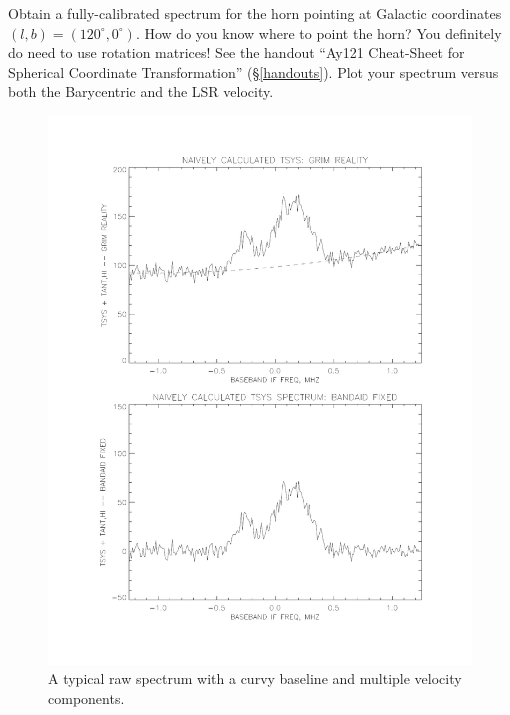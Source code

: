 \documentclass[12pt,preprint]{aastex}
\begin{document}
Obtain a fully-calibrated spectrum for the horn pointing at Galactic
coordinates $(l,b)=(120^\circ, 0^\circ)$. How do you know where to point
the horn? You definitely do need to use rotation matrices!  See the
handout ``Ay121 Cheat-Sheet for Spherical Coordinate Transformation''
(\S \ref{handouts}). Plot your spectrum versus both the Barycentric and
the LSR velocity. 

\begin{figure}[h!]
\begin{center}
%       
\includegraphics[scale=0.5]{bmp_cal1.pdf}
\end{center}
\vspace{-0.3in}
\caption{\footnotesize A typical raw spectrum with a curvy baseline and
  multiple velocity components. \label{rawspect}}
\end{figure}
\end{document}
